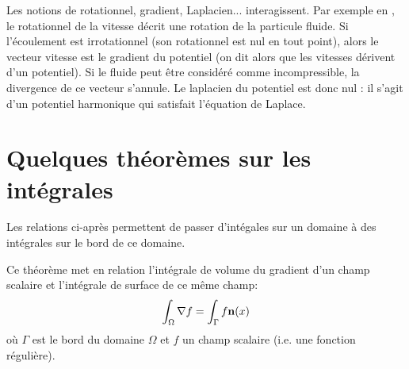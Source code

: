 \bigskip
Les notions de rotationnel, gradient, Laplacien... interagissent. Par exemple en
, le rotationnel de la vitesse décrit une rotation de la particule fluide.
Si l'écoulement est irrotationnel (son rotationnel est nul en tout point), alors le vecteur vitesse est le gradient du
potentiel (on dit alors que les vitesses dérivent d'un potentiel).
Si le fluide peut être considéré comme incompressible, la divergence de ce vecteur s'annule.
Le laplacien du potentiel est donc nul : il s'agit d'un potentiel harmonique qui satisfait l'équation de Laplace.

\ifVersionDuDocEstVincent\medskip\fi
\section{Quelques théorèmes sur les intégrales}

Les relations ci-après permettent de passer d'intégales sur un domaine à des
intégrales sur le bord de ce domaine.%


\ifVersionDuDocEstVincent\medskip\fi
\begin{theoreme}

Ce théorème met en relation l'intégrale de volume du gradient d'un champ scalaire et l'intégrale
de surface de ce même champ:
 \begin{equation}
    \int_\Omega \nabla f = \int_\Gamma f \mathbf{n}(x)
\end{equation}
où $\Gamma$ est le bord du domaine $\Omega$ et $f$ un champ scalaire (i.e. une fonction régulière).
\end{theoreme}

